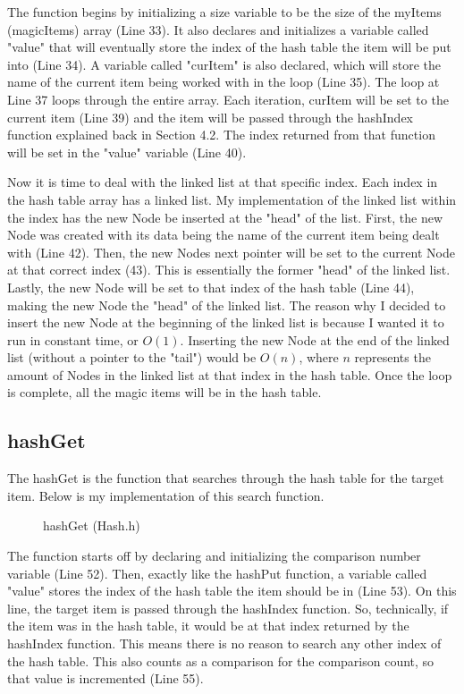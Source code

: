 \documentclass[letterpaper, 10pt]{article}
\begin{document}
\noindent
The function begins by initializing a size variable to be the size of the myItems (magicItems) array (Line 33). It also declares and initializes a variable called "value" that will eventually store the index of the hash table the item will be put into (Line 34). A variable called "curItem" is also declared, which will store the name of the current item being worked with in the loop (Line 35). The loop at Line 37 loops through the entire array. Each iteration, curItem will be set to the current item (Line 39) and the item will be passed through the hashIndex function explained back in Section 4.2. The index returned from that function will be set in the "value" variable (Line 40).

\vspace{1em}

\noindent
Now it is time to deal with the linked list at that specific index. Each index in the hash table array has a linked list. My implementation of the linked list within the index has the new Node be inserted at the "head" of the list. First, the new Node was created with its data being the name of the current item being dealt with (Line 42). Then, the new Nodes next pointer will be set to the current Node at that correct index (43). This is essentially the former "head" of the linked list. Lastly, the new Node will be set to that index of the hash table (Line 44), making the new Node the "head" of the linked list. The reason why I decided to insert the new Node at the beginning of the linked list is because I wanted it to run in constant time, or $O(1)$. Inserting the new Node at the end of the linked list (without a pointer to the "tail") would be $O(n)$, where $n$ represents the amount of Nodes in the linked list at that index in the hash table. Once the loop is complete, all the magic items will be in the hash table.

\subsection{hashGet}
\noindent
The hashGet is the function that searches through the hash table for the target item. Below is my implementation of this search function.
\begin{figure}[H]
  \centering
  
  \caption{hashGet (Hash.h)}
  \label{fig:figure4.5}
\end{figure}

\noindent
The function starts off by declaring and initializing the comparison number variable (Line 52). Then, exactly like the hashPut function, a variable called "value" stores the index of the hash table the item should be in (Line 53). On this line, the target item is passed through the hashIndex function. So, technically, if the item was in the hash table, it would be at that index returned by the hashIndex function. This means there is no reason to search any other index of the hash table. This also counts as a comparison for the comparison count, so that value is incremented (Line 55).
\end{document}
